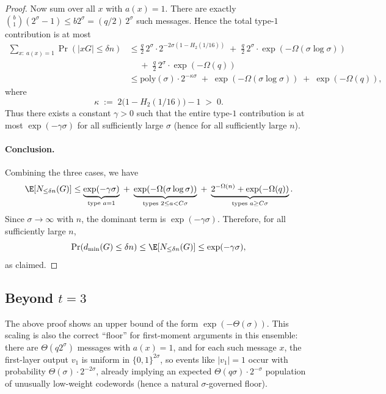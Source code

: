 \begin{proof}
Now sum over all $x$ with $a(x)=1$.
There are exactly $\binom{b}{1}(2^\sigma-1)\le b2^\sigma = (q/2)\,2^\sigma$ such messages.
Hence the total type-$1$ contribution is at most
\begin{align*}
\sum_{x:\ a(x)=1}\Pr(|xG|\le \delta n)
&\le \frac{q}{2}\,2^\sigma\cdot 2^{-2\sigma(1-H_2(1/16))} \;+\; \frac{q}{2}\,2^\sigma\cdot \exp(-\Omega(\sigma\log\sigma)) \\
&\quad
\;+\; \frac{q}{2}\,2^\sigma\cdot \exp(-\Omega(q)) \\
&\le \mathrm{poly}(\sigma)\cdot 2^{-\kappa\sigma} \;+\; \exp(-\Omega(\sigma\log\sigma))\;+\;\exp(-\Omega(q)),
\end{align*}
where
\[
\kappa \;:=\; 2\bigl(1-H_2(1/16)\bigr)-1 \;>\; 0.
\]
Thus there exists a constant $\gamma>0$ such that the entire type-$1$ contribution is at most $\exp(-\gamma\sigma)$
for all sufficiently large $\sigma$ (hence for all sufficiently large $n$).

\paragraph{Conclusion.}
Combining the three cases, we have
\[
\E[N_{\le\delta n}(G)]
\le
\underbrace{\exp(-\gamma\sigma)}_{\text{type }a=1}
\;+\;
\underbrace{\exp(-\Omega(\sigma\log\sigma))}_{\text{types }2\le a<C\sigma}
\;+\;
\underbrace{2^{-\Omega(n)}+\exp(-\Omega(q))}_{\text{types }a\ge C\sigma}.
\]
Since $\sigma\to\infty$ with $n$, the dominant term is $\exp(-\gamma\sigma)$.
Therefore, for all sufficiently large $n$,
\[
\Pr(d_{\min}(G)\le \delta n)\le \E[N_{\le\delta n}(G)]\le \exp(-\gamma\sigma),
\]
as claimed.
\end{proof}


\subsection{Beyond $t=3$}

The above proof shows an upper bound of the form $\exp(-\Theta(\sigma))$.
This scaling is also the correct ``floor'' for first-moment arguments in this ensemble:
there are $\Theta(q 2^\sigma)$ messages with $a(x)=1$, and for each such message $x$,
the first-layer output $v_1$ is uniform in $\{0,1\}^{2\sigma}$, so events like $|v_1|=1$ occur with probability
$\Theta(\sigma)\cdot 2^{-2\sigma}$, already implying an expected $\Theta(q\sigma)\cdot 2^{-\sigma}$
population of unusually low-weight codewords (hence a natural $\sigma$-governed floor).






